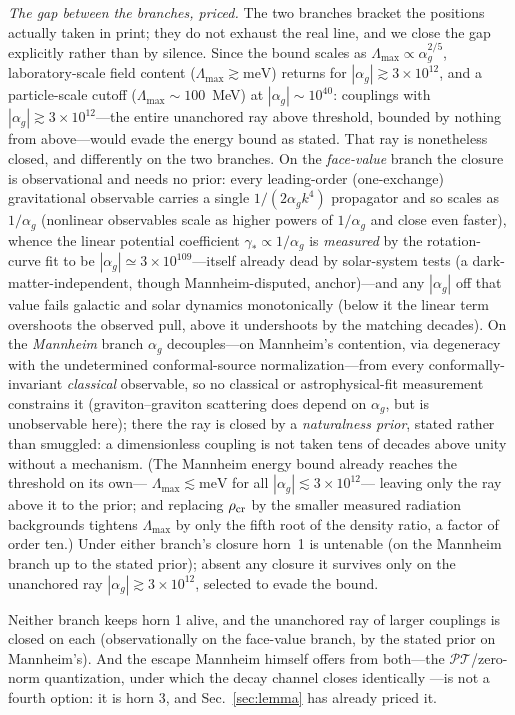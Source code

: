 \documentclass[11pt]{article}
\theoremstyle{definition}
\theoremstyle{remark}
\newcommand{\PT}{\mathcal{PT}}
\newcommand{\ag}{\alpha_g}
\begin{document}
\emph{The gap between the branches, priced.} The two branches
bracket the positions actually taken in print; they do not exhaust
the real line, and we close the gap explicitly rather than by
silence. Since the bound scales as
$\Lambda_{\max}\propto\ag^{2/5}$, laboratory-scale field content
($\Lambda_{\max}\gtrsim\mathrm{meV}$) returns for
$|\ag|\gtrsim3\times10^{12}$, and a particle-scale cutoff
($\Lambda_{\max}\sim100$~MeV) at $|\ag|\sim10^{40}$: couplings with
$|\ag|\gtrsim3\times10^{12}$---the entire unanchored ray above threshold,
bounded by nothing from above---would evade the energy bound as stated.
That ray is nonetheless closed, and differently on the two branches. On the
\emph{face-value} branch the closure is observational and needs no prior:
every leading-order (one-exchange) gravitational observable carries a single
$1/(2\ag k^{4})$ propagator and so scales as $1/\ag$ (nonlinear observables
scale as higher powers of $1/\ag$ and close even faster), whence the linear
potential coefficient
$\gamma_*\propto1/\ag$ is \emph{measured} by the rotation-curve fit to be
$|\ag|\simeq3\times10^{109}$---itself already dead by solar-system tests
\cite{Flanagan2006} (a dark-matter-independent, though Mannheim-disputed, anchor)---and any $|\ag|$ off
that value fails galactic and
solar dynamics monotonically (below it the linear term overshoots the
observed pull, above it undershoots by the matching decades). On the
\emph{Mannheim} branch $\ag$ decouples---on Mannheim's contention, via
degeneracy with the undetermined conformal-source normalization---from every conformally-invariant
\emph{classical} observable, so no classical or astrophysical-fit measurement
constrains it (graviton--graviton scattering does depend on $\ag$, but is
unobservable here); there the ray is closed by a
\emph{naturalness prior}, stated rather than smuggled: a dimensionless
coupling is not taken tens of decades above unity without a mechanism. (The
Mannheim energy bound already reaches the threshold on its own---%
$\Lambda_{\max}\lesssim\mathrm{meV}$ for all $|\ag|\lesssim3\times10^{12}$---%
leaving only the ray above it to the prior; and replacing $\rho_{\rm cr}$ by
the smaller measured radiation backgrounds tightens $\Lambda_{\max}$ by only
the fifth root of the density ratio, a factor of order ten.) Under either
branch's closure horn~1 is untenable (on the Mannheim branch up to the stated
prior); absent any closure it survives only on
the unanchored ray $|\ag|\gtrsim3\times10^{12}$, selected to evade the
bound.

Neither branch keeps horn 1 alive, and the unanchored ray of larger
couplings is closed on each (observationally on the face-value branch, by
the stated prior on Mannheim's). And the escape Mannheim himself
offers from both---the $\PT$/zero-norm quantization, under which
the decay channel closes identically
\cite{BenderMannheim2008,Mannheim2020}---is not a fourth option:
it is horn 3, and Sec.~\ref{sec:lemma} has already priced it.
\end{document}
